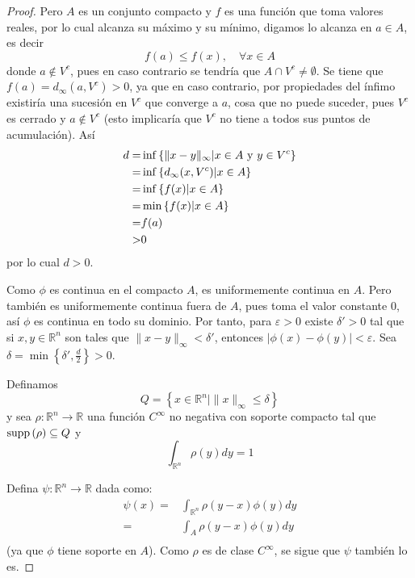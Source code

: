 \documentclass[12pt]{report}
\theoremstyle{largebreak}
\newcommand\abs[1]{\ensuremath{\lvert#1\rvert}}
\newcommand\cf[3]{\ensuremath{#1:#2\rightarrow#3}}
\newcommand\supp[1]{\ensuremath{\textup{supp}\left(#1\right)}}
\begin{document}
\begin{proof}
    Pero $A$ es un conjunto compacto y $f$ es una función que toma valores reales, por lo cual alcanza su máximo y su mínimo, digamos lo alcanza en $a\in A$, es decir
    \begin{equation*}
        f(a)\leq f(x),\quad\forall x\in A
    \end{equation*}
    donde $a\notin V^c$, pues en caso contrario se tendría que $A\cap V^c\neq \emptyset$. Se tiene que $f(a)=d_{\infty}(a,V^c)>0$, ya que en caso contrario, por propiedades del ínfimo existiría una sucesión en $V^c$ que converge a $a$, cosa que no puede suceder, pues $V^c$ es cerrado y $a\notin V^c$ (esto implicaría que $V^c$ no tiene a todos sus puntos de acumulación). Así
    \begin{equation*}
        \begin{split}
            d=&\inf\left\{\|x-y\|_{\infty}|x\in A \textup{ y }y\in V^c\right\}\\
            =&\inf\left\{d_{\infty}(x,V^c)|x\in A\right\}\\
            =&\inf\left\{f(x)|x\in A\right\}\\
            =&\min\left\{f(x)|x\in A\right\}\\
            =&f(a)\\
            >&0\\
        \end{split}
    \end{equation*}
    por lo cual $d>0$.
    
    Como $\phi$ es continua en el compacto $A$, es uniformemente continua en $A$. Pero también es uniformemente continua fuera de $A$, pues toma el valor constante $0$, así $\phi$ es continua en todo su dominio.
    Por tanto, para $\varepsilon>0$ existe $\delta'>0$ tal que si $x,y\in\mathbb{R}^n$ son tales que $\|x-y\|_{\infty}<\delta'$, entonces $\abs{\phi(x)-\phi(y)}<\varepsilon$. Sea $\delta =\min\left\{\delta',\frac{d}{2}\right\}>0$.
    
    Definamos
    \begin{equation*}
        Q=\left\{x\in\mathbb{R}^n|\|x\|_{\infty}\leq\delta\right\}
    \end{equation*}
    y sea $\cf{\rho}{\mathbb{R}^n}{\mathbb{R}}$ una función $C^{\infty}$ no negativa con soporte compacto tal que $\supp{\rho}\subseteq Q$ y
    \begin{equation*}
        \int_{\mathbb{R}^n}\rho(y)dy=1
    \end{equation*}
    
    Defina $\cf{\psi}{\mathbb{R}^n}{\mathbb{R}}$ dada como:
    \begin{equation*}
        \begin{split}
            \psi(x)=&\int_{\mathbb{R}^n}\rho(y-x)\phi(y)dy\\
            =&\int_{A}\rho(y-x)\phi(y)dy\\
        \end{split}
    \end{equation*}
    (ya que $\phi$ tiene soporte en $A$). Como $\rho$ es de clase $C^{\infty}$, se sigue que $\psi$ también lo es.


\end{proof}
\end{document}
